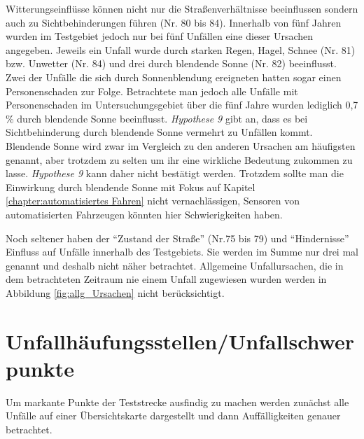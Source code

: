 Witterungseinflüsse können nicht nur die Straßenverhältnisse beeinflussen sondern auch zu Sichtbehinderungen führen (Nr. 80 bis 84). Innerhalb von fünf Jahren wurden im Testgebiet jedoch nur bei fünf Unfällen eine dieser Ursachen angegeben. Jeweils ein Unfall wurde durch starken Regen, Hagel, Schnee (Nr. 81) bzw. Unwetter (Nr. 84) und drei durch blendende Sonne (Nr. 82) beeinflusst. Zwei der Unfälle die sich durch Sonnenblendung ereigneten hatten sogar einen Personenschaden zur Folge. Betrachtete man jedoch alle Unfälle mit Personenschaden im Untersuchungsgebiet über die fünf Jahre wurden lediglich 0,7 \% durch blendende Sonne beeinflusst. \textit{Hypothese 9} gibt an, dass es bei Sichtbehinderung durch blendende Sonne vermehrt zu Unfällen kommt. Blendende Sonne wird zwar im Vergleich zu den anderen Ursachen am häufigsten genannt, aber trotzdem zu selten um ihr eine wirkliche Bedeutung zukommen zu lasse. \textit{Hypothese 9} kann daher nicht bestätigt werden. %
Trotzdem sollte man die Einwirkung durch blendende Sonne mit Fokus auf Kapitel \ref{chapter:automatisiertes Fahren} nicht vernachlässigen, Sensoren von automatisierten Fahrzeugen könnten hier Schwierigkeiten haben.
 
Noch seltener haben der \enquote{Zustand der Straße} (Nr.75 bis 79) und \enquote{Hindernisse} Einfluss auf Unfälle innerhalb des Testgebiets. Sie werden im Summe nur drei mal genannt und deshalb nicht näher betrachtet. Allgemeine Unfallursachen, die in dem betrachteten Zeitraum nie einem Unfall zugewiesen wurden werden in Abbildung \ref{fig:allg_Ursachen} nicht berücksichtigt.


\section{Unfallhäufungsstellen/Unfallschwerpunkte}
Um markante Punkte der Teststrecke ausfindig zu machen werden zunächst alle Unfälle auf einer Übersichtskarte dargestellt und dann Auffälligkeiten genauer betrachtet.



